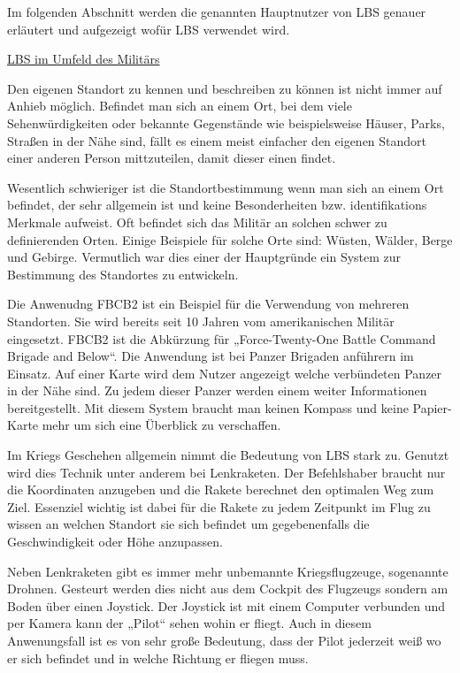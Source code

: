 Im folgenden Abschnitt werden die genannten Hauptnutzer von LBS genauer erläutert und aufgezeigt wofür LBS verwendet wird.


\underline{LBS im Umfeld des Militärs}

Den eigenen Standort zu kennen und beschreiben zu können ist nicht immer auf Anhieb möglich. Befindet man sich an einem Ort, bei dem viele Sehenwürdigkeiten oder bekannte Gegenstände wie beispielsweise Häuser, Parks, Straßen in der Nähe sind, fällt es einem meist einfacher den eigenen Standort einer anderen Person mittzuteilen, damit dieser einen findet.

Wesentlich schwieriger ist die Standortbestimmung wenn man sich an einem Ort befindet, der sehr allgemein ist und keine Besonderheiten bzw. identifikations Merkmale aufweist. Oft befindet sich das Militär an solchen schwer zu definierenden Orten. Einige Beispiele für solche Orte sind: Wüsten, Wälder, Berge und Gebirge. Vermutlich war dies einer der Hauptgründe ein System zur Bestimmung des Standortes zu entwickeln. 

Die Anwenudng FBCB2 ist ein Beispiel für die Verwendung von mehreren Standorten. Sie wird bereits seit 10 Jahren vom amerikanischen Militär eingesetzt. FBCB2 ist die Abkürzung für „Force-Twenty-One Battle Command Brigade and Below“. Die Anwendung ist bei Panzer Brigaden anführern im Einsatz. Auf einer Karte wird dem Nutzer angezeigt welche verbündeten Panzer in der Nähe sind. Zu jedem dieser Panzer werden einem weiter Informationen bereitgestellt. Mit diesem System braucht man keinen Kompass und keine Papier- Karte mehr um sich eine Überblick zu verschaffen. 

Im Kriegs Geschehen allgemein nimmt die Bedeutung von LBS stark zu. Genutzt wird dies Technik unter anderem bei Lenkraketen. Der Befehlshaber braucht nur die Koordinaten anzugeben und die Rakete berechnet den optimalen Weg zum Ziel. Essenziel wichtig ist dabei für die Rakete zu jedem Zeitpunkt im Flug zu wissen an welchen Standort sie sich befindet um gegebenenfalls die Geschwindigkeit oder Höhe anzupassen. 

Neben Lenkraketen gibt es immer mehr unbemannte Kriegsflugzeuge, sogenannte Drohnen. Gesteurt werden dies nicht aus dem Cockpit des Flugzeugs sondern am Boden über einen Joystick. Der Joystick ist mit einem Computer verbunden und per Kamera kann der „Pilot“ sehen wohin er fliegt. Auch in diesem Anwenungsfall ist es von sehr große Bedeutung, dass der Pilot jederzeit weiß wo er sich befindet und in welche Richtung er fliegen muss.

